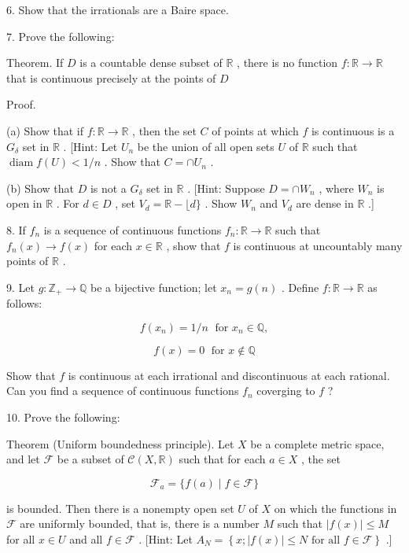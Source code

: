 \documentclass[10pt]{article}
\begin{document}
6. Show that the irrationals are a Baire space.

7. Prove the following:

Theorem. If \(D\) is a countable dense subset of \(\mathbb{R}\) , there is no function \(f : \mathbb{R} \rightarrow  \mathbb{R}\) that is continuous precisely at the points of \(D\)

Proof.

(a) Show that if \(f : \mathbb{R} \rightarrow  \mathbb{R}\) , then the set \(C\) of points at which \(f\) is continuous is a \({G}_{\delta }\) set in \(\mathbb{R}\) . [Hint: Let \({U}_{n}\) be the union of all open sets \(U\) of \(\mathbb{R}\) such that \(\operatorname{diam}f\left( U\right)  < 1/n\) . Show that \(C =  \cap  {U}_{n}\) .

(b) Show that \(D\) is not a \({G}_{\delta }\) set in \(\mathbb{R}\) . [Hint: Suppose \(D =  \cap  {W}_{n}\) , where \({W}_{n}\) is open in \(\mathbb{R}\) . For \(d \in  D\) , set \({V}_{d} = \mathbb{R} - \lfloor d\}\) . Show \({W}_{n}\) and \({V}_{d}\) are dense in \(\mathbb{R}\) .]

8. If \({f}_{n}\) is a sequence of continuous functions \({f}_{n} : \mathbb{R} \rightarrow  \mathbb{R}\) such that \({f}_{n}\left( x\right)  \rightarrow  f\left( x\right)\) for each \(x \in  \mathbb{R}\) , show that \(f\) is continuous at uncountably many points of \(\mathbb{R}\) .

9. Let \(g : {\mathbb{Z}}_{ + } \rightarrow  \mathbb{Q}\) be a bijective function; let \({x}_{n} = g\left( n\right)\) . Define \(f : \mathbb{R} \rightarrow  \mathbb{R}\) as follows:

\[
f\left( {x}_{n}\right)  = 1/n\;\text{ for }{x}_{n} \in  \mathbb{Q},
\]

\[
f\left( x\right)  = 0\;\text{ for }x \notin  \mathbb{Q}
\]

Show that \(f\) is continuous at each irrational and discontinuous at each rational. Can you find a sequence of continuous functions \({f}_{n}\) coverging to \(f\) ?

10. Prove the following:

Theorem (Uniform boundedness principle). Let \(X\) be a complete metric space, and let \(\mathcal{F}\) be a subset of \(\mathcal{C}\left( {X,\mathbb{R}}\right)\) such that for each \(a \in  X\) , the set

\[
{\mathcal{F}}_{a} = \{ f\left( a\right)  \mid  f \in  \mathcal{F}\}
\]

is bounded. Then there is a nonempty open set \(U\) of \(X\) on which the functions in \(\mathcal{F}\) are uniformly bounded, that is, there is a number \(M\) such that \(\left| {f\left( x\right) }\right|  \leq  M\) for all \(x \in  U\) and all \(f \in  \mathcal{F}\) . [Hint: Let \({A}_{N} = \left\{  {x;\left| {f\left( x\right) }\right|  \leq  N\text{ for all }f \in  \mathcal{F}}\right\}\) .]
\end{document}
